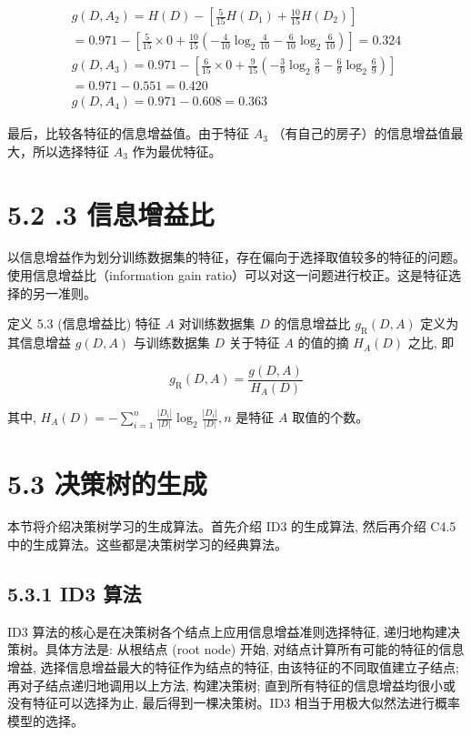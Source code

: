\documentclass[10pt]{article}
\begin{document}
\begin{CJK*}{UTF8}{bsmi}
$$
\begin{gathered}
g\left(D, A_{2}\right)=H(D)-\left[\frac{5}{15} H\left(D_{1}\right)+\frac{10}{15} H\left(D_{2}\right)\right] \\
=0.971-\left[\frac{5}{15} \times 0+\frac{10}{15}\left(-\frac{4}{10} \log _{2} \frac{4}{10}-\frac{6}{10} \log _{2} \frac{6}{10}\right)\right]=0.324 \\
g\left(D, A_{3}\right)=0.971-\left[\frac{6}{15} \times 0+\frac{9}{15}\left(-\frac{3}{9} \log _{2} \frac{3}{9}-\frac{6}{9} \log _{2} \frac{6}{9}\right)\right] \\
=0.971-0.551=0.420 \\
g\left(D, A_{4}\right)=0.971-0.608=0.363
\end{gathered}
$$

最后，比较各特征的信息增益值。由于特征 $A_{3}$ （有自己的房子）的信息增益值最大，所以选择特征 $A_{3}$ 作为最优特征。

\section*{5.2 .3 信息增益比}
以信息增益作为划分训练数据集的特征，存在偏向于选择取值较多的特征的问题。使用信息增益比（information gain ratio）可以对这一问题进行校正。这是特征选择的另一准则。

定义 5.3 (信息增益比) 特征 $A$ 对训练数据集 $D$ 的信息增益比 $g_{\mathrm{R}}(D, A)$ 定义为其信息增益 $g(D, A)$ 与训练数据集 $D$ 关于特征 $A$ 的值的摘 $H_{A}(D)$ 之比, 即


\begin{equation*}
g_{\mathrm{R}}(D, A)=\frac{g(D, A)}{H_{A}(D)} \tag{5.10}
\end{equation*}


其中, $H_{A}(D)=-\sum_{i=1}^{n} \frac{\left|D_{i}\right|}{|D|} \log _{2} \frac{\left|D_{i}\right|}{|D|}, n$ 是特征 $A$ 取值的个数。

\section*{5.3 决策树的生成}
本节将介绍决策树学习的生成算法。首先介绍 ID3 的生成算法, 然后再介绍 C4.5 中的生成算法。这些都是决策树学习的经典算法。

\subsection*{5.3.1 ID3 算法}
ID3 算法的核心是在决策树各个结点上应用信息增益准则选择特征, 递归地构建决策树。具体方法是: 从根结点 (root node) 开始, 对结点计算所有可能的特征的信息增益, 选择信息增益最大的特征作为结点的特征, 由该特征的不同取值建立子结点; 再对子结点递归地调用以上方法, 构建决策树; 直到所有特征的信息增益均很小或没有特征可以选择为止, 最后得到一棵决策树。ID3 相当于用极大似然法进行概率模型的选择。


\end{CJK*}
\end{document}
